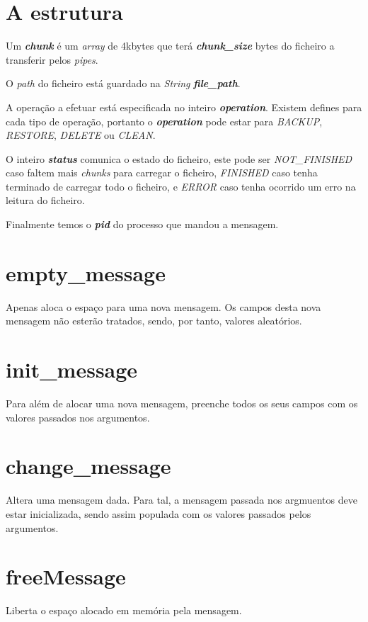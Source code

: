 \documentclass[12pt,a4paper]{report}
\begin{document}
\section{A estrutura}

\hspace{0cm}\par
Um \emph{\bfseries{chunk}} é um \emph{array} de 4kbytes que terá \emph{\bfseries{chunk\_size}} bytes do ficheiro a transferir pelos \emph{pipes}. \par
O \emph{path} do ficheiro está guardado na \emph{String} \emph{\bfseries{file\_path}}. \par
A operação a efetuar está especificada no inteiro \emph{\bfseries{operation}}. Existem defines para cada tipo de operação, portanto o \emph{\bfseries{operation}} pode estar para \emph{BACKUP}, \emph{RESTORE}, \emph{DELETE} ou \emph{CLEAN}. \par
O inteiro \emph{\bfseries{status}} comunica o estado do ficheiro, este pode ser \emph{NOT\_FINISHED} caso faltem mais \emph{chunks} para carregar o ficheiro, \emph{FINISHED} caso tenha terminado de carregar todo o ficheiro, e \emph{ERROR} caso tenha ocorrido um erro na leitura do ficheiro.\par
Finalmente temos o \emph{\bfseries{pid}} do processo que mandou a mensagem.

\section{empty\_message}
Apenas aloca o espaço para uma nova mensagem. Os campos desta nova mensagem não esterão tratados, sendo, por tanto, valores aleatórios.\par

\section{init\_message}
Para além de alocar uma nova mensagem, preenche todos os seus campos com os valores passados nos argumentos.\par

\section{change\_message}
Altera uma mensagem dada. Para tal, a mensagem passada nos argmuentos deve estar inicializada, sendo assim populada com os valores passados pelos argumentos.

\section{freeMessage}
Liberta o espaço alocado em memória pela mensagem.
\end{document}
